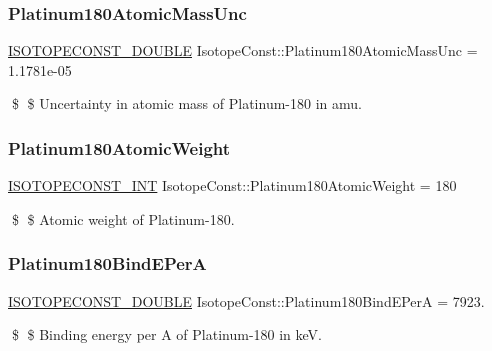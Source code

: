 \subsubsection{\texorpdfstring{Platinum180\+Atomic\+Mass\+Unc}{Platinum180AtomicMassUnc}}
{\footnotesize\ttfamily \mbox{\hyperlink{group___isotope_const-_macros_ga8f45a7272ce02c0b4c65c44636ed719a}{I\+S\+O\+T\+O\+P\+E\+C\+O\+N\+S\+T\+\_\+\+D\+O\+U\+B\+LE}} Isotope\+Const\+::\+Platinum180\+Atomic\+Mass\+Unc = 1.\+1781e-\/05}

\$ \$ Uncertainty in atomic mass of Platinum-\/180 in amu. \mbox{\label{group___isotope_const-_platinum-_pt180_gaf49778b22e65ca505c266e6a89398e61}} 
\subsubsection{\texorpdfstring{Platinum180\+Atomic\+Weight}{Platinum180AtomicWeight}}
{\footnotesize\ttfamily \mbox{\hyperlink{group___isotope_const-_macros_ga5f18360b3e99483a35c32d789e62621c}{I\+S\+O\+T\+O\+P\+E\+C\+O\+N\+S\+T\+\_\+\+I\+NT}} Isotope\+Const\+::\+Platinum180\+Atomic\+Weight = 180}

\$ \$ Atomic weight of Platinum-\/180. \mbox{\label{group___isotope_const-_platinum-_pt180_gae60816c333972bf5becf592c55c9bc8d}} 
\subsubsection{\texorpdfstring{Platinum180\+Bind\+E\+PerA}{Platinum180BindEPerA}}
{\footnotesize\ttfamily \mbox{\hyperlink{group___isotope_const-_macros_ga8f45a7272ce02c0b4c65c44636ed719a}{I\+S\+O\+T\+O\+P\+E\+C\+O\+N\+S\+T\+\_\+\+D\+O\+U\+B\+LE}} Isotope\+Const\+::\+Platinum180\+Bind\+E\+PerA = 7923.}

\$ \$ Binding energy per A of Platinum-\/180 in keV. \mbox{\label{group___isotope_const-_platinum-_pt180_ga0a83dcd622839a762ab5fe5200cd9d00}} 
